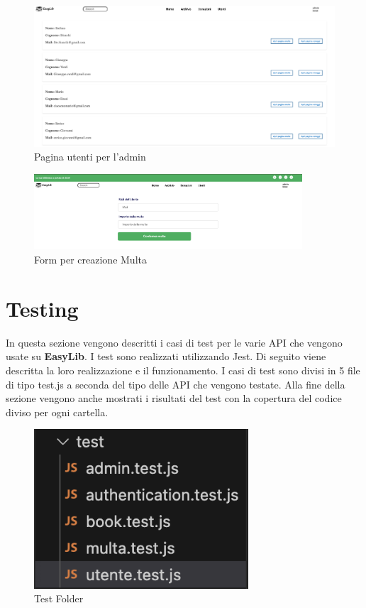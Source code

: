 \documentclass{article}
\begin{document}
\begin{figure}[H]
    \centering
    \includegraphics[width=130mm]{D4/Images/UtentiAdmin.png}
    \caption{Pagina utenti per l'admin}
\end{figure}

\begin{figure}[H]
    \centering
    \includegraphics[width=100mm]{D4/Images/Multa.png}
    \caption{Form per creazione Multa}
\end{figure}

\newpage

\section{Testing}
In questa sezione vengono descritti i casi di test per le  varie API che vengono usate su \textbf{EasyLib}. 
I test sono realizzati utilizzando Jest. 
Di seguito viene descritta la loro realizzazione e il funzionamento.
I casi di test sono divisi in 5 file di tipo test.js a seconda del tipo delle API che vengono testate.
Alla fine della sezione vengono anche mostrati i risultati del test con la copertura del codice diviso per ogni cartella.
\begin{figure}[H]
    \centering
    \includegraphics[width=80mm]{D4/Images/CartellaTest.png}
    \caption{Test Folder}
\end{figure}
\end{document}

